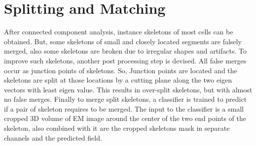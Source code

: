 \section{Splitting and Matching}
After connected component analysis, instance skeletons of most cells can be obtained. But, some skeletons of small and closely located segments are falsely merged, also some skeletons are broken due to irregular shapes and artifacts. To improve such skeletons, another post processing step is devised. 
All false merges occur as junction points of skeletons. So, Junction points are located and the skeletons are split at those locations by a cutting plane along the two eigen vectors with least eigen value.
This results in over-split skeletons, but with almost no false merges.
Finally to merge split skeletons, a classifier is trained to predict if a pair of skeleton requires to be merged. The input to the classifier is a small cropped 3D volume of EM image around the center of the two end points of the skeleton, also combined with it are the cropped skeletons mask in separate channels and the predicted field.

